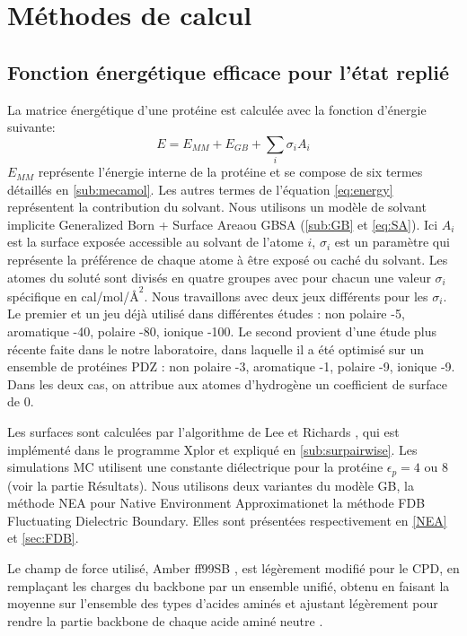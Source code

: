 \section{Méthodes de calcul}
  
\subsection{Fonction énergétique efficace pour l'état replié}
\label{sec:phia}
La matrice énergétique d'une protéine est calculée avec la fonction d'énergie suivante:
\begin{equation}
  E = E_{MM} + E_{GB} + \sum_i \sigma_iA_i
  \label{eq:energy} 
\end{equation}
$E_{MM}$ représente l'énergie interne de la protéine et se compose de six termes détaillés en \ref{sub:mecamol}. Les autres termes de l'équation \ref{eq:energy} représentent la contribution du solvant. Nous utilisons un modèle de solvant implicite \og Generalized Born + Surface Area\fg ou GBSA (\ref{sub:GB} et \ref{eq:SA}). Ici $A_i$ est la surface exposée accessible au solvant de l'atome $i$, $\sigma_i$ est un paramètre qui représente la préférence de chaque atome à être exposé ou caché du solvant. Les atomes du soluté sont divisés en quatre groupes avec pour chacun une valeur $\sigma_i$ spécifique en cal/mol/$Å^2$. Nous travaillons avec deux jeux différents pour les $\sigma_i$. Le premier et un jeu déjà utilisé dans différentes études \cite{Mignon16,Druart16b}: non polaire -5, aromatique -40, polaire -80, ionique -100. Le second provient d'une étude plus récente faite dans le notre laboratoire, dans laquelle il a été optimisé sur un ensemble de protéines PDZ \cite{Gaillard16}: non polaire -3, aromatique -1, polaire -9, ionique -9. Dans les deux cas, on attribue aux atomes d'hydrogène un coefficient de surface de 0.

Les surfaces sont calculées par l'algorithme de Lee et Richards \cite{Lee71},  qui est implémenté dans le programme Xplor \cite{Xplor} et expliqué en \ref{sub:surpairwise}. Les simulations MC utilisent une constante diélectrique pour la protéine $\epsilon_p = 4$ ou $8$ (voir la partie Résultats).
Nous utilisons deux variantes du modèle  GB, la méthode NEA pour \og Native Environment Approximation\fg et la méthode FDB \og Fluctuating Dielectric Boundary\fg \cite{Villa17}. Elles sont présentées respectivement en \ref{NEA} et \ref{sec:FDB}.

Le champ de force utilisé, Amber ff99SB \cite{Cornell95}, est légèrement modifié pour le CPD, en remplaçant les charges du backbone par un ensemble unifié, obtenu en faisant la moyenne sur l'ensemble des types d'acides aminés et ajustant légèrement pour rendre la partie backbone de chaque acide aminé neutre \cite{Aleksandrov10}.

